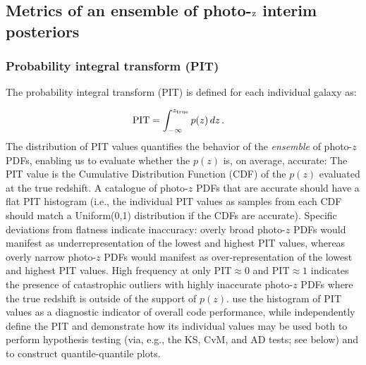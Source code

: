 \documentclass[usenatbib]{mn2e}
\newcommand*\mathinhead[2]{\texorpdfstring{$\boldsymbol{#1}$}{#2}}
\newcommand{\red}[1]{\textcolor{red}{#1}}
\begin{document}

\subsection{Metrics of an ensemble of photo-\mathinhead{$z$}{z} interim posteriors}
\label{sec:qualmet}

\subsubsection{Probability integral transform (PIT)}
\label{sec:pit}

The probability integral transform (PIT) \citep{Polsterer:16} is defined for each individual galaxy as:%

\begin{align}
\label{eq:pit}
\mathrm{PIT} &= \int_{-\infty}^{z_{\rm true}}p(z)\, dz \,.
\end{align}
The distribution of PIT values quantifies the behavior of the {\it ensemble} of photo-$z$ PDFs, enabling us to evaluate whether the $p(z)$ is, on average, accurate:  The PIT value is the Cumulative Distribution Function (CDF) of the $p(z)$ evaluated at the true redshift.  A catalogue of photo-$z$ PDFs that are accurate should have a flat PIT histogram (i.e., the individual PIT values as samples from each CDF should match a Uniform(0,1) distribution if the CDFs are accurate).  Specific deviations from flatness indicate inaccuracy: overly broad photo-$z$ PDFs would manifest as underrepresentation of the lowest and highest PIT values, whereas overly narrow photo-$z$ PDFs would manifest as over-representation of the lowest and highest PIT values. 
High frequency at only $\mathrm{PIT}\approx0$ and $\mathrm{PIT}\approx1$ indicates the presence of catastrophic outliers with highly inaccurate photo-$z$ PDFs where the true redshift is outside of the support of $p(z)$.
\citet{Tanaka:17} use the histogram of PIT values as a diagnostic indicator of overall code performance, while \citet{Freeman:17} independently define the PIT and demonstrate how its individual values may be used both to perform hypothesis testing (via, e.g., the KS, CvM, and AD tests; see below) and to construct quantile-quantile plots. 
\end{document}
